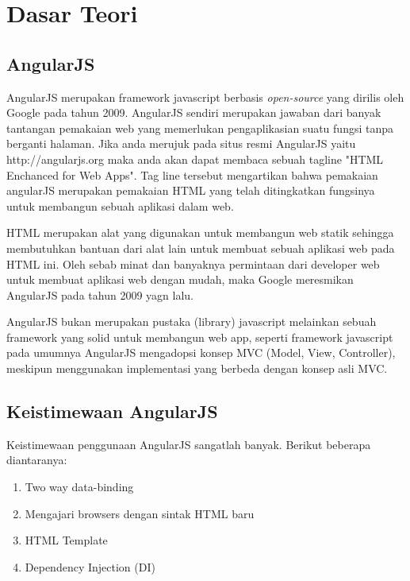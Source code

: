 \chapter{Dasar Teori}
\label{chap: dasarTeori}

\section{AngularJS}
\label{sec: angularJS}
	
	AngularJS \cite{angularJS} merupakan framework javascript berbasis \textit{open-source} yang dirilis oleh Google pada tahun 2009. AngularJS sendiri merupakan jawaban dari banyak tantangan pemakaian web yang memerlukan pengaplikasian suatu fungsi tanpa berganti halaman. Jika anda merujuk pada situs resmi AngularJS yaitu http://angularjs.org maka anda akan dapat membaca sebuah tagline "HTML Enchanced for Web Apps". Tag line tersebut mengartikan bahwa pemakaian angularJS merupakan pemakaian HTML yang telah ditingkatkan fungsinya untuk membangun sebuah aplikasi dalam web.
	
	HTML merupakan alat yang digunakan untuk membangun web statik sehingga membutuhkan bantuan dari alat lain untuk membuat sebuah aplikasi web pada HTML ini. Oleh sebab minat dan banyaknya permintaan dari developer web untuk membuat aplikasi web dengan mudah, maka Google meresmikan AngularJS pada tahun 2009 yagn lalu.
	
	AngularJS bukan merupakan pustaka (library) javascript melainkan sebuah framework yang solid untuk membangun web app, seperti framework javascript pada umumnya AngularJS mengadopsi konsep MVC (Model, View, Controller), meskipun menggunakan implementasi yang berbeda dengan konsep asli MVC.
	
\section{Keistimewaan AngularJS}
\label{sec: keistimewaanAngularJS}
	Keistimewaan penggunaan AngularJS sangatlah banyak. Berikut beberapa diantaranya:
	
	\begin{enumerate}
		\item Two way data-binding
		\item Mengajari browsers dengan sintak HTML baru	
		\item HTML Template
		\item Dependency Injection (DI)
	\end{enumerate}
	
